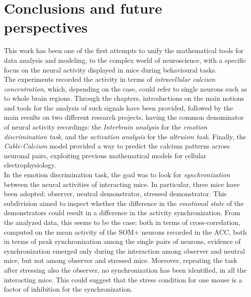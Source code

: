 \documentclass[12pt, a4paper]{report}
\begin{document}
\chapter*{Conclusions and future perspectives}

This work has been one of the first attempts to unify the mathematical tools for data analysis and modeling, to the complex world of neuroscience, with a specific focus on the neural activity displayed in mice during behavioural tasks.\\
The experiments recorded  the activity in terms of \textit{intracellular calcium concentration}, which, depending on the case, could refer to single neurons such as to whole brain regions. Through the chapters, introductions on the main notions and tools for the analysis of such signals have been provided, followed by the main results on two different research projects, having the common denominator of neural activity recordings: the \textit{Interbrain analysis} for the \textit{emotion discrimination task}, and the \textit{activation analysis} for the \textit{altruism task}. Finally, the \textit{Cable-Calcium} model provided a way to predict the calcium patterns across neuronal pairs, exploiting previous mathematical models for cellular electrophysiology.\\

In the  emotion discrimination task, the goal was to look for \textit{synchronization} between the neural activities of interacting mice. In particular, three mice have been adopted: observer, neutral demonstrator, stressed demonstrator. This subdivision aimed to inspect whether the difference in the \textit{emotional state} of the demonstrators could result in a difference in the activity synchronization. From the analyzed data, this seems to be the case: both in terms of cross-correlation, computed on the mean activity of the SOM+ neurons recorded in the ACC, both in terms of peak synchronization among the single pairs of neurons, evidence of synchronization emerged only during the interaction among  observer and  neutral mice, but not among  observer and  stressed mice. Moreover, repeating the task after stressing also the observer, no synchronization has been identified, in all the interacting mice.
This could suggest that the stress condition for one mouse is a factor of inhibition for the synchronization. \\
\end{document}
